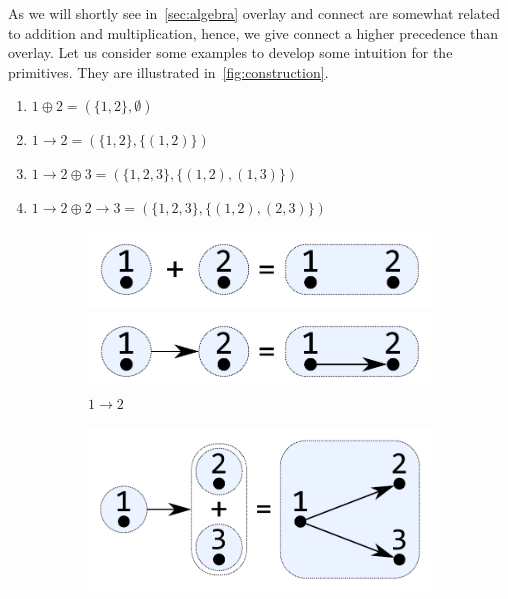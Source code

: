 \documentclass{article}
\newcommand{\overlay}{\oplus}
\newcommand{\connect}{\rightarrow}
\begin{document}
As we will shortly see in~\autoref{sec:algebra} overlay and connect are somewhat
related to addition and multiplication, hence, we give connect a higher precedence
than overlay. Let us consider some examples to develop some intuition for the
primitives. They are illustrated in~\autoref{fig:construction}.
\begin{enumerate}[label=(\alph*)]
\item $1 \overlay 2 = (\{1,2\}, \emptyset)$
\item $1 \connect 2 = (\{1,2\}, \{(1,2)\})$
\item $1 \connect 2 \overlay 3 = (\{1,2,3\}, \{(1,2), (1,3)\})$
\item $1 \connect 2 \overlay 2 \connect 3 = (\{1,2,3\}, \{(1,2), (2,3)\})$
\end{enumerate}
\begin{figure}
  \centering
  \begin{subfigure}[b]{0.3\linewidth}
    \centerline{\includegraphics[scale=0.27]{fig/ex-a.pdf}}
    \vspace{-2.4mm}
    \caption{$1 \overlay 2$}
    \centerline{\includegraphics[scale=0.27]{fig/ex-b.pdf}}
    \vspace{-2.4mm}
    \caption{$1 \connect 2$}
  \end{subfigure}
  \begin{subfigure}[b]{0.3\linewidth}
    \centerline{\includegraphics[scale=0.27]{fig/ex-c.pdf}}

\end{subfigure}
\end{figure}
\end{document}
